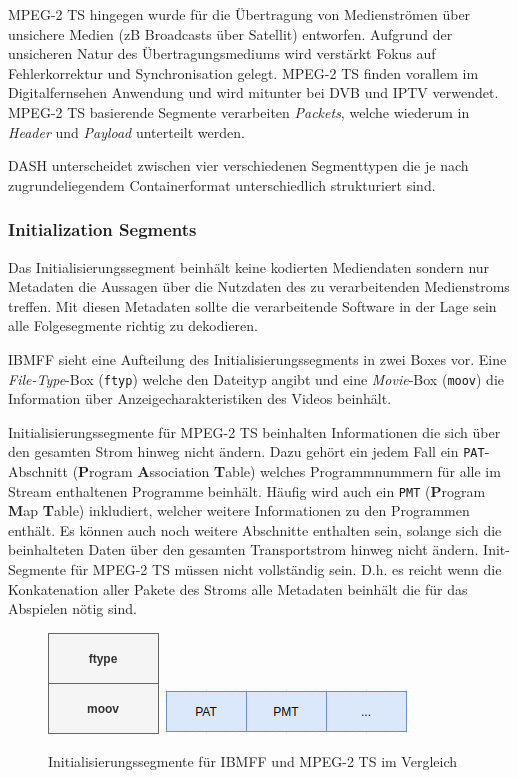 \documentclass[paper = a4, fontsize = 12pt, parskip = half]{scrartcl} %
\def\attr#1{\texttt{#1}}
\begin{document}
MPEG-2 TS hingegen wurde für die Übertragung von Medienströmen über unsichere Medien (zB Broadcasts über Satellit) entworfen. Aufgrund der unsicheren Natur des Übertragungsmediums wird verstärkt Fokus auf Fehlerkorrektur und Synchronisation gelegt. MPEG-2 TS finden vorallem im Digitalfernsehen Anwendung und wird mitunter bei DVB und IPTV verwendet. MPEG-2 TS basierende Segmente verarbeiten \textit{Packets}, welche wiederum in \textit{Header} und \textit{Payload} unterteilt werden.

DASH unterscheidet zwischen vier verschiedenen Segmenttypen die je nach zugrundeliegendem Containerformat unterschiedlich strukturiert sind.

\subsubsection{Initialization Segments}
Das Initialisierungssegment beinhält keine kodierten Mediendaten sondern nur Metadaten die Aussagen über die Nutzdaten des zu verarbeitenden Medienstroms treffen. Mit diesen Metadaten sollte die verarbeitende Software in der Lage sein alle Folgesegmente richtig zu dekodieren.

IBMFF sieht eine Aufteilung des Initialisierungssegments in zwei Boxes vor. Eine \textit{File-Type}-Box (\attr{ftyp}) welche den Dateityp angibt und eine \textit{Movie}-Box (\attr{moov}) die Information über Anzeigecharakteristiken des Videos beinhält.

Initialisierungssegmente für MPEG-2 TS beinhalten Informationen die sich über den gesamten Strom hinweg nicht ändern. Dazu gehört ein jedem Fall ein \attr{PAT}-Abschnitt (\textbf{P}rogram \textbf{A}ssociation \textbf{T}able) welches Programmnummern für alle im Stream enthaltenen Programme beinhält. Häufig wird auch ein \attr{PMT} (\textbf{P}rogram \textbf{M}ap \textbf{T}able) inkludiert, welcher weitere Informationen zu den Programmen enthält. Es können auch noch weitere Abschnitte enthalten sein, solange sich die beinhalteten Daten über den gesamten Transportstrom hinweg nicht ändern.
Init-Segmente für MPEG-2 TS müssen nicht vollständig sein. D.h. es reicht wenn die Konkatenation aller Pakete des Stroms alle Metadaten beinhält die für das Abspielen nötig sind.

\begin{center}
	\begin{figure}[h]
		\centering
		\includegraphics{images/isobmff_init-seg.png}
		\includegraphics{images/mpeg2ts_init-seg.png}
		\caption{Initialisierungssegmente für IBMFF und MPEG-2 TS im Vergleich}
	\end{figure}
\end{center}
\end{document}
